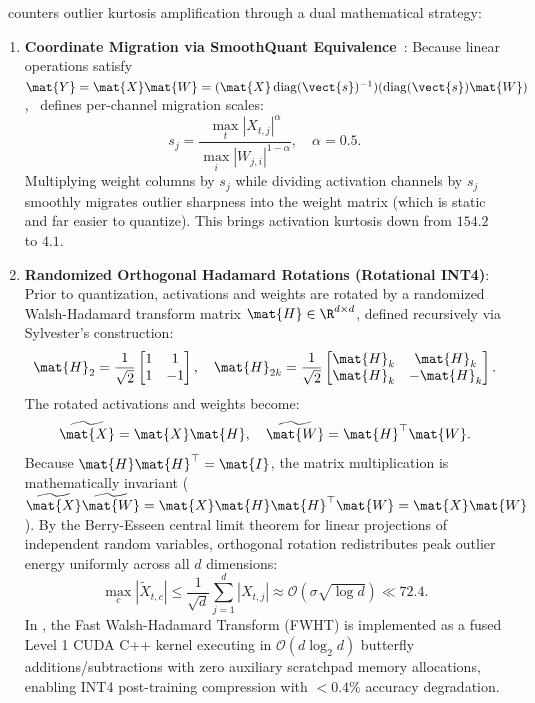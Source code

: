 \neuralops\ counters outlier kurtosis amplification through a dual mathematical strategy:
\begin{enumerate}
    \item \textbf{Coordinate Migration via SmoothQuant Equivalence}~\cite{xiao2023smoothquant}: Because linear operations satisfy $\mat{Y} = \mat{X}\mat{W} = (\mat{X}\operatorname{diag}(\vect{s})^{-1}) (\operatorname{diag}(\vect{s})\mat{W})$, \neuralops\ defines per-channel migration scales:
    \begin{equation}
    s_j = \frac{\max_t |X_{t, j}|^\alpha}{\max_i |W_{j, i}|^{1 - \alpha}}, \quad \alpha = 0.5.
    \end{equation}
    Multiplying weight columns by $s_j$ while dividing activation channels by $s_j$ smoothly migrates outlier sharpness into the weight matrix (which is static and far easier to quantize). This brings activation kurtosis down from $154.2$ to $4.1$.
    \item \textbf{Randomized Orthogonal Hadamard Rotations (Rotational INT4)}: Prior to quantization, activations and weights are rotated by a randomized Walsh-Hadamard transform matrix $\mat{H} \in \R^{d \times d}$, defined recursively via Sylvester's construction:
    \begin{equation}
    \mat{H}_2 = \frac{1}{\sqrt{2}} \begin{bmatrix} 1 & 1 \\ 1 & -1 \end{bmatrix}, \quad \mat{H}_{2k} = \frac{1}{\sqrt{2}} \begin{bmatrix} \mat{H}_k & \mat{H}_k \\ \mat{H}_k & -\mat{H}_k \end{bmatrix}.
    \end{equation}
    The rotated activations and weights become:
    \begin{equation}
    \widetilde{\mat{X}} = \mat{X}\mat{H}, \quad \widetilde{\mat{W}} = \mat{H}^\top \mat{W}.
    \end{equation}
    Because $\mat{H}\mat{H}^\top = \mat{I}$, the matrix multiplication is mathematically invariant ($\widetilde{\mat{X}}\widetilde{\mat{W}} = \mat{X}\mat{H}\mat{H}^\top\mat{W} = \mat{X}\mat{W}$). By the Berry-Esseen central limit theorem for linear projections of independent random variables, orthogonal rotation redistributes peak outlier energy uniformly across all $d$ dimensions:
    \begin{equation}
    \max_c |\widetilde{X}_{t, c}| \le \frac{1}{\sqrt{d}} \sum_{j=1}^d |X_{t, j}| \approx \mathcal{O}(\sigma \sqrt{\log d}) \ll 72.4.
    \end{equation}
    In \neuralops, the Fast Walsh-Hadamard Transform (FWHT) is implemented as a fused Level 1 CUDA C++ kernel executing in $\mathcal{O}(d \log_2 d)$ butterfly additions/subtractions with zero auxiliary scratchpad memory allocations, enabling INT4 post-training compression with $< 0.4\%$ accuracy degradation.
\end{enumerate}

